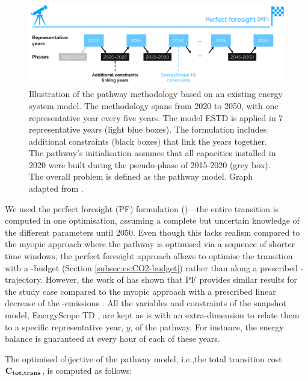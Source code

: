 \documentclass[11pt,twoside,a4paper,english]{article}
\def\ie{i.e.,}
\begin{document}
\begin{appendices}
\begin{figure}[htbp!]
\centering
\includegraphics[width=\textwidth]{ES_Pathway.pdf}
\caption{Illustration of the pathway methodology based on an existing energy system model. The methodology spans from 2020 to 2050, with one representative year every five years. The model \acrfull{ESTD} is applied in 7 representative years (light blue boxes). The formulation includes additional constraints (black boxes) that link the years together. The pathway's initialisation assumes that all capacities installed in 2020 were built during the pseudo-phase of 2015-2020 (grey box). The overall problem is defined as the pathway model. Graph adapted from \cite{limpens2024pathway}.}
\label{fig:meth_path_methodology}
\end{figure}

We used the perfect foresight (PF) formulation ()---the entire transition is computed in one optimisation, assuming a complete but uncertain knowledge of the different parameters until 2050. Even though this lacks realism compared to the myopic approach \cite{babrowski2014reducing,fais2016impact,heuberger2018impact} where the pathway is optimised via a sequence of shorter time windows, the perfect foresight approach allows to optimise the transition with a -budget (Section \ref{subsec:cs:CO2-budget}) rather than along a prescribed -trajectory. However, the work of \citet{limpens2024pathway} has shown that PF provides similar results for the study case compared to the myopic approach with a prescribed linear decrease of the -emissions . All the variables and constraints of the snapshot model, EnergyScope TD \cite{limpens2019energyscope}, are kept as is with an extra-dimension to relate them to a specific representative year, $y$, of the pathway. For instance, the energy balance is guaranteed at every hour of each of these years. 

The optimised objective of the pathway model, \ie the total transition cost $\textbf{C\textsubscript{tot,trans}}$, is computed as follows: 


\end{appendices}
\end{document}
